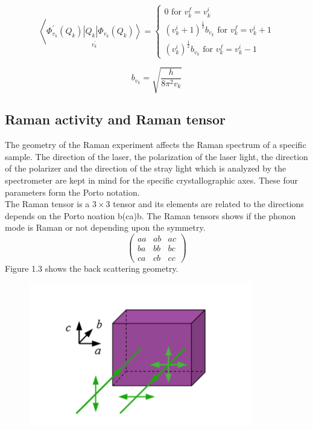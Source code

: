 \documentclass[openany,11pt,a4paper]{report}
\begin{document}
\begin{equation}
\left\langle\underset{v_{k}^{\prime}}{\left.\Phi_{v_{k}}^{\prime}\left(Q_{k}\right)\left|Q_{k}\right| \Phi_{v_{k}}\left(Q_{k}\right)\right\rangle}=\left\{\begin{array}{c}{0 \text { for } v_{k}^{f}=v_{k}^{i}} \\ {\left(v_{k}^{i}+1\right)^{\frac{1}{2}} b_{v_{k}} \text { for } v_{k}^{f}=v_{k}^{i}+1} \\ {\left(v_{k}^{i}\right)^{\frac{1}{2}} b_{v_{k}} \text { for } v_{k}^{f}=v_{k}^{i}-1}\end{array}\right.\right.
\end{equation}

\begin{equation}
b_{v_{k}}=\sqrt{\frac{h}{8 \pi^{2} v_{k}}}
\end{equation} 
\cite{bib2}





\subsection*{Raman activity and Raman tensor}
  

The geometry of the Raman experiment affects the Raman spectrum of a specific sample. The direction of the laser, the polarization of the laser light, the direction of the polarizer and the direction of the stray light which is analyzed by the spectrometer are  kept in mind for the specific crystallographic axes. These four parameters form the Porto notation. \\
The Raman tensor is a $3\times 3$  
tensor     
and its elements are related to the directions depends on the Porto noation b(ca)b. The Raman tensors shows if the phonon mode is Raman or not depending upon the symmetry. 
$$
\left(\begin{array}{lll}{a a} & {a b} & {a c} \\ {b a} & {b b} & {b c} \\ {c a} & {c b} & {c c}\end{array}\right)
$$
Figure 1.3 shows the back scattering geometry. 

\begin{figure}[H]
\centering
\includegraphics[scale=1]{geometry.PNG}    
\caption{}
\label{Fig:67}
\end{figure}
\end{document}
